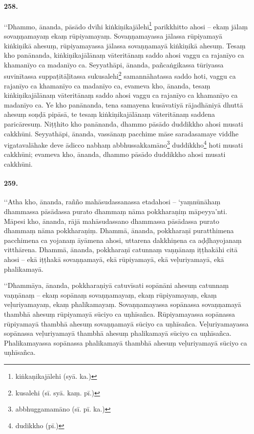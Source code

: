 \paragraph{258.} ‘‘Dhammo, ānanda, pāsādo dvīhi kiṅkiṇikajālehi\footnote{kiṅkaṇikajālehi (syā. ka.)} parikkhitto ahosi – ekaṃ jālaṃ sovaṇṇamayaṃ ekaṃ rūpiyamayaṃ. Sovaṇṇamayassa jālassa rūpiyamayā kiṅkiṇikā ahesuṃ, rūpiyamayassa jālassa sovaṇṇamayā kiṅkiṇikā ahesuṃ. Tesaṃ kho panānanda, kiṅkiṇikajālānaṃ vāteritānaṃ saddo ahosi vaggu ca rajanīyo ca khamanīyo ca madanīyo ca. Seyyathāpi, ānanda, pañcaṅgikassa tūriyassa suvinītassa suppaṭitāḷitassa sukusalehi\footnote{kusalehi (sī. syā. kaṃ. pī.)} samannāhatassa saddo hoti, vaggu ca rajanīyo ca khamanīyo ca madanīyo ca, evameva kho, ānanda, tesaṃ kiṅkiṇikajālānaṃ vāteritānaṃ saddo ahosi vaggu ca rajanīyo ca khamanīyo ca madanīyo ca. Ye kho panānanda, tena samayena kusāvatiyā rājadhāniyā dhuttā ahesuṃ soṇḍā pipāsā, te tesaṃ kiṅkiṇikajālānaṃ vāteritānaṃ saddena paricāresuṃ. Niṭṭhito kho panānanda, dhammo pāsādo duddikkho ahosi musati cakkhūni. Seyyathāpi, ānanda, vassānaṃ pacchime māse saradasamaye viddhe vigatavalāhake deve ādicco nabhaṃ abbhussakkamāno\footnote{abbhuggamamāno (sī. pī. ka.)} duddikkho\footnote{dudikkho (pī.)} hoti musati cakkhūni; evameva kho, ānanda, dhammo pāsādo duddikkho ahosi musati cakkhūni.

\paragraph{259.} ‘‘Atha kho, ānanda, rañño mahāsudassanassa etadahosi – ‘yaṃnūnāhaṃ dhammassa pāsādassa purato dhammaṃ nāma pokkharaṇiṃ māpeyya’nti. Māpesi kho, ānanda, rājā mahāsudassano dhammassa pāsādassa purato dhammaṃ nāma pokkharaṇiṃ. Dhammā, ānanda, pokkharaṇī puratthimena pacchimena ca yojanaṃ āyāmena ahosi, uttarena dakkhiṇena ca aḍḍhayojanaṃ vitthārena. Dhammā, ānanda, pokkharaṇī catunnaṃ vaṇṇānaṃ iṭṭhakāhi citā ahosi – ekā iṭṭhakā sovaṇṇamayā, ekā rūpiyamayā, ekā veḷuriyamayā, ekā phalikamayā.

‘‘Dhammāya, ānanda, pokkharaṇiyā catuvīsati sopānāni ahesuṃ catunnaṃ vaṇṇānaṃ – ekaṃ sopānaṃ sovaṇṇamayaṃ, ekaṃ rūpiyamayaṃ, ekaṃ veḷuriyamayaṃ, ekaṃ phalikamayaṃ. Sovaṇṇamayassa sopānassa sovaṇṇamayā thambhā ahesuṃ rūpiyamayā sūciyo ca uṇhīsañca. Rūpiyamayassa sopānassa rūpiyamayā thambhā ahesuṃ sovaṇṇamayā sūciyo ca uṇhīsañca. Veḷuriyamayassa sopānassa veḷuriyamayā thambhā ahesuṃ phalikamayā sūciyo ca uṇhīsañca. Phalikamayassa sopānassa phalikamayā thambhā ahesuṃ veḷuriyamayā sūciyo ca uṇhīsañca.

